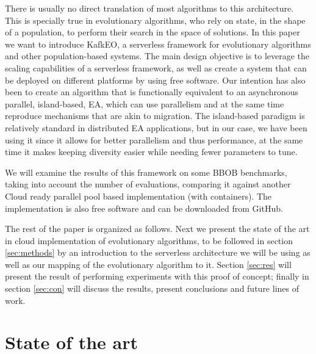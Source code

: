 \documentclass{llncs}
\begin{document}
  There is usually no direct translation of most algorithms to this
  architecture. This is specially true in evolutionary algorithms, who
  rely on state, in the shape of a population, to perform their search
  in the space of solutions.
  In this paper we want to introduce KafkEO, a serverless framework for
  evolutionary algorithms and other population-based systems. The main
  design objective is to leverage the scaling capabilities of a
  serverless framework, as well as create a system that can be deployed
  on different platforms by using free software. Our intention has
  also been to create an algorithm that is functionally equivalent to an asynchronous
  parallel, island-based, EA, which can use parallelism and at the same
  time reproduce mechanisms that are akin to migration. The island-based 
  paradigm is relatively standard in distributed EA applications, but in our case, 
  we have been using it since it allows for better parallelism
  and thus performance, at the same time it makes keeping diversity
  easier while needing fewer parameters to tune.

  
  
  We will examine the results of this framework on some BBOB benchmarks,
  taking into account
  the number of evaluations, comparing it
  against another Cloud ready parallel pool based implementation (with
  containers).
  The
  implementation is also free software and can be downloaded from
  GitHub.


  The rest of the paper is organized as follows. Next we present the
  state of the art in cloud implementation of evolutionary algorithms,
  to be followed in section \ref{sec:methods} by an introduction to the
  serverless architecture we will be using as well as our mapping of the
  evolutionary algorithm to it. Section \ref{sec:res} will present the
  result of performing experiments with this proof of concept; finally
  in section \ref{sec:con} will discuss the results, present conclusions
  and future lines of work.

  \section{State of the art}
\end{document}
